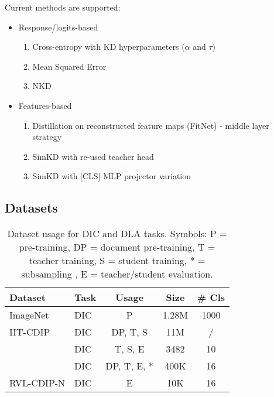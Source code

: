 Current \KD{} methods are supported: 
\begin{itemize}
\item  Response/logits-based
\begin{enumerate}
    \item Cross-entropy with KD hyperparameters ($\alpha$ and $\tau$) \cite{hinton2015distilling}
    \item Mean Squared Error \cite{kim2021comparing}
    \item NKD \cite{yang2023knowledge}
\end{enumerate}
\item  Features-based
\begin{enumerate}
    \item Distillation on reconstructed feature maps (FitNet) - middle layer strategy \cite{romero2014fitnets}
    \item SimKD with re-used teacher head \cite{SimKD} %
    \item SimKD with [CLS] MLP projector variation
\end{enumerate}
\end{itemize}



\subsection{Datasets}

\begin{table}[ht]
\centering
\caption{Dataset usage for DIC and DLA tasks. 
Symbols: P = pre-training, DP = document pre-training, T = teacher training, S = student training, * = subsampling , E = teacher/student evaluation.}
\begin{tabular}{|l|l|c|c|c|}
\hline
\textbf{Dataset} & \textbf{Task} & \textbf{Usage} & \textbf{Size} & \textbf{\# Cls} \\ \hline
ImageNet \cite{deng2009imagenet} & DIC & P & 1.28M & 1000 \\ \hline
IIT-CDIP \cite{lewis2006building} & DIC & DP, T, S & 11M & / \\ \hline
\tobacco{} \cite{kumar2013unsupervised} & DIC & T, S, E & 3482 & 10 \\ \hline
\rvl{} \cite{harley2015evaluation} & DIC & DP, T, E, * & 400K & 16 \\ \hline
RVL-CDIP-N \cite{larson2022evaluating} & DIC & E & 10K & 16 \\ \hline
\hline
\end{tabular}
\label{tab:DKD-datasets}
\end{table}

